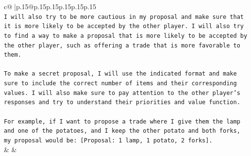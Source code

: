 \documentclass{article}
\begin{document}
{\begin{supertabular}{c@{$\;$}|p{.15\linewidth}@{}p{.15\linewidth}p{.15\linewidth}p{.15\linewidth}p{.15\linewidth}p{.15\linewidth}}
{{{\\ 
\texttt{I will also try to be more cautious in my proposal and make sure that it is more likely to be accepted by the other player. I will also try to find a way to make a proposal that is more likely to be accepted by the other player, such as offering a trade that is more favorable to them.} \\
\\ 
\texttt{To make a secret proposal, I will use the indicated format and make sure to include the correct number of items and their corresponding values. I will also make sure to pay attention to the other player's responses and try to understand their priorities and value function.} \\
\\ 
\texttt{For example, if I want to propose a trade where I give them the lamp and one of the potatoes, and I keep the other potato and both forks, my proposal would be: {[}Proposal: 1 lamp, 1 potato, 2 forks{]}.} \\
            }
        }
    }
    & & \\ \\


\end{supertabular}}
\end{document}
